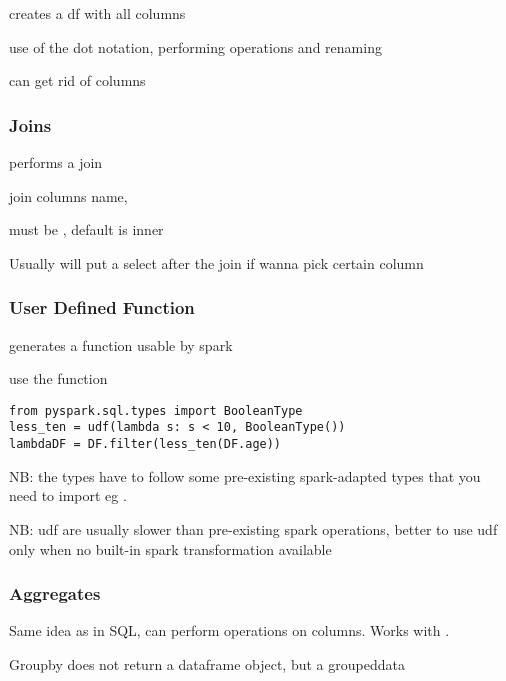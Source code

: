 				 creates a df with all columns

				 use of the dot notation, performing operations and renaming

				 can get rid of columns


			\subsubsection{Joins}


				 performs a join

				 join columns name, 

				 must be , default is inner

				Usually will put a select after the join if wanna pick certain column



			\subsubsection{User Defined Function}

				 generates a function usable by spark

				 use the function

\begin{lstlisting}
from pyspark.sql.types import BooleanType
less_ten = udf(lambda s: s < 10, BooleanType())
lambdaDF = DF.filter(less_ten(DF.age))
\end{lstlisting}

				NB: the types have to follow some pre-existing spark-adapted types that you need to import eg .

				NB: udf are usually slower than pre-existing spark operations, better to use udf only when no built-in spark transformation available


			\subsubsection{Aggregates}

				Same idea as in SQL, can perform operations on columns. Works with .

				Groupby does not return a dataframe object, but a groupeddata

